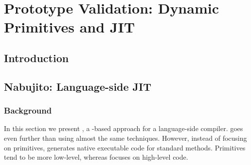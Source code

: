 

\chapter{Prototype Validation: Dynamic Primitives and JIT}
\minitoc


\section{Introduction}


\section{Nabujito: Language-side JIT}

\subsection{Background}
In this section we present \NBJ, a \B-based approach for a language-side \JIT compiler.
\NBJ goes even further than \WF using almost the same techniques.
However, instead of focusing on primitives, \NBJ generates native executable code for standard \ST methods.
Primitives tend to be more low-level, whereas \NBJ focuses on high-level \ST code. 



